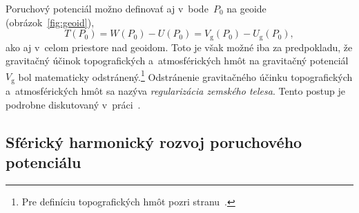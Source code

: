 \documentclass[a4paper, 12pt]{book}
\newcommand{\gidx}{\mathrm g}
\begin{document}
Poruchový potenciál možno definovať aj v~bode~$P_0$ na geoide 
(obrázok~\ref{fig:geoid}),
%
\begin{equation}
T(P_0) = W(P_0) - U(P_0) = V_\gidx(P_0) - U_\gidx(P_0){,}
\end{equation}
%
ako aj v~celom priestore nad geoidom.  Toto je však možné iba za predpokladu, 
že gravitačný účinok topografických a~atmosférických hmôt na gravitačný 
potenciál~$V_\gidx$ bol matematicky odstránený.\footnote{Pre definíciu 
topografických hmôt pozri stranu~\pageref{def:topographic_masses}.}  
Odstránenie gravitačného účinku topografických a~atmosférických hmôt sa nazýva 
\emph{regularizácia zemského telesa}.  Tento postup je podrobne diskutovaný 
v~práci~\textcite{Janak2006}.


\subsection{Sférický harmonický rozvoj poruchového potenciálu}
\end{document}
